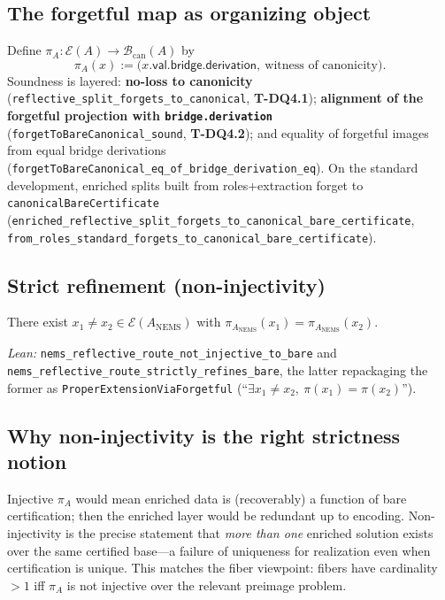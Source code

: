 \documentclass[11pt]{article}
\begin{document}
\subsection{The forgetful map as organizing object}\label{sec:strict-refinement-forgetful}
Define $\pi_A : \mathcal{E}(A) \to \mathcal{B}_{\mathrm{can}}(A)$ by
\[
  \pi_A(x) := \bigl(x.\mathsf{val}.\mathsf{bridge}.\mathsf{derivation},\ \text{witness of canonicity}\bigr).
\]
Soundness is layered: \textbf{no-loss to canonicity} (\texttt{reflective\_split\_forgets\_to\_canonical}, \textbf{T-DQ4.1}); \textbf{alignment of the forgetful projection with \texttt{bridge.derivation}} (\texttt{forgetToBareCanonical\_sound}, \textbf{T-DQ4.2}); and equality of forgetful images from equal bridge derivations (\texttt{forgetToBareCanonical\_eq\_of\_bridge\_derivation\_eq}). On the standard development, enriched splits built from roles+extraction forget to \texttt{canonicalBareCertificate} (\texttt{enriched\_reflective\_split\_forgets\_to\_canonical\_bare\_certificate}, \texttt{from\_roles\_standard\_forgets\_to\_canonical\_bare\_certificate}).

\subsection{Strict refinement (non-injectivity)}\label{sec:strict-refinement-thm}
\begin{theorem}\label{thm:strict-refinement}
There exist $x_1 \neq x_2 \in \mathcal{E}(A_{\mathrm{NEMS}})$ with $\pi_{A_{\mathrm{NEMS}}}(x_1) = \pi_{A_{\mathrm{NEMS}}}(x_2)$.
\end{theorem}

\noindent\emph{Lean:} \texttt{nems\_reflective\_route\_not\_injective\_to\_bare} and \texttt{nems\_reflective\_route\_strictly\_refines\_bare}, the latter repackaging the former as \texttt{ProperExtensionViaForgetful} (``$\exists x_1 \neq x_2,\ \pi(x_1)=\pi(x_2)$'').

\subsection{Why non-injectivity is the right strictness notion}\label{sec:strict-refinement-why}
Injective $\pi_A$ would mean enriched data is (recoverably) a function of bare certification; then the enriched layer would be redundant up to encoding. Non-injectivity is the precise statement that \emph{more than one} enriched solution exists over the same certified base---a failure of uniqueness for realization even when certification is unique. This matches the fiber viewpoint: fibers have cardinality $>1$ iff $\pi_A$ is not injective over the relevant preimage problem.
\end{document}
